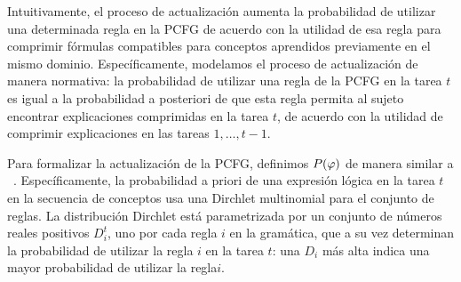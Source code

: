 
Intuitivamente, el proceso de actualización aumenta la probabilidad de utilizar una determinada regla en la PCFG de acuerdo con la utilidad de esa regla para comprimir fórmulas compatibles para conceptos aprendidos previamente en el mismo dominio. Específicamente, modelamos el proceso de actualización de manera normativa: la probabilidad de utilizar una regla de la PCFG en la tarea $t$ es igual a la probabilidad a posteriori de que esta regla permita al sujeto encontrar explicaciones comprimidas en la tarea $t$, de acuerdo con la utilidad de comprimir explicaciones en las tareas $1,\dots,t-1$.


Para formalizar la actualización de la PCFG, definimos $P(\varphi)$ de manera similar a ~\cite{goodman2008rational}. Específicamente, la probabilidad a priori de una expresión lógica en la tarea $t$ en la secuencia de conceptos usa una Dirchlet multinomial para el conjunto de reglas. La distribución Dirchlet está parametrizada por un conjunto de números reales positivos $D_{i}^{t}$, uno por cada regla $i$ en la gramática, que a su vez determinan la probabilidad de utilizar la regla $i$ en la tarea $t$: una $D_{i}$ más alta indica una mayor probabilidad de utilizar la regla$i$.



